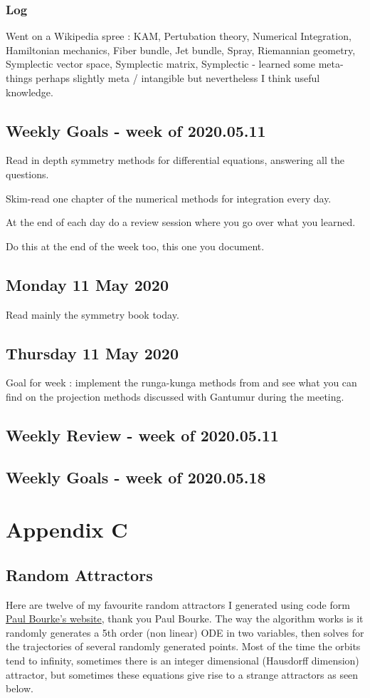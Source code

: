 \documentclass[12pt]{article}
\begin{document}
\subsubsection{Log}
Went on a Wikipedia spree : KAM, Pertubation theory, Numerical Integration, Hamiltonian mechanics, Fiber bundle, Jet bundle, Spray, Riemannian geometry, Symplectic vector space, Symplectic matrix, Symplectic - learned some meta-things perhaps slightly meta / intangible but nevertheless I think useful knowledge. 


\subsection{Weekly Goals - week of 2020.05.11}
Read in depth symmetry methods for differential equations, answering all the questions. 

Skim-read one chapter of the numerical methods for integration every day. 

At the end of each day do a review session where you go over what you learned. 

Do this at the end of the week too, this one you document. 

\subsection{Monday 11 May 2020}
Read mainly the symmetry book today. 

\subsection{Thursday 11 May 2020}
Goal for week : implement the runga-kunga methods from \cite{Duruisseaux} and see what you can find on the projection methods discussed with Gantumur during the meeting. 


\subsection{Weekly Review - week of 2020.05.11}

\subsection{Weekly Goals - week of 2020.05.18}

\section{Appendix C}\label{appendix c}
\subsection{Random Attractors}
Here are twelve of my favourite random attractors I generated using code form \href{http://paulbourke.net/fractals/lyapunov/}{Paul Bourke's website}, thank you Paul Bourke. The way the algorithm works is it randomly generates a 5th order (non linear) ODE in two variables, then solves for the trajectories of several randomly generated points. Most of the time the orbits tend to infinity, sometimes there is an integer dimensional (Hausdorff dimension) attractor, but sometimes these equations give rise to a strange attractors as seen below. 
\end{document}
